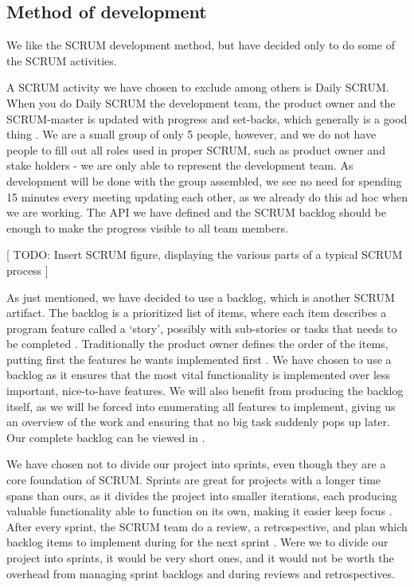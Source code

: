 \subsection{Method of development}
We like the SCRUM development method, but have decided only to do some of the SCRUM activities.

A SCRUM activity we have chosen to exclude among others is Daily SCRUM.
When you do Daily SCRUM the development team, the product owner and the SCRUM-master is updated with progress and set-backs, which generally is a good thing \cite[p. ?]{?}.
We are a small group of only 5 people, however, and we do not have people to fill out all roles used in proper SCRUM, such as product owner and stake holders - we are only able to represent the development team.
As development will be done with the group assembled, we see no need for spending 15 minutes every meeting updating each other, as we already do this ad hoc when we are working.
The API we have defined and the SCRUM backlog should be enough to make the progress visible to all team members.

[ TODO: Insert SCRUM figure, displaying the various parts of a typical SCRUM process ]

As just mentioned, we have decided to use a backlog, which is another SCRUM artifact.
The backlog is a prioritized list of items, where each item describes a program feature called a `story', possibly with sub-stories or tasks that needs to be completed \cite[p. ?]{?}. Traditionally the product owner defines the order of the items, putting first the features he wants implemented first \cite[p. ?]{?}.
We have chosen to use a backlog as it ensures that the most vital functionality is implemented over less important, nice-to-have features. We will also benefit from producing the backlog itself, as we will be forced into enumerating all features to implement, giving us an overview of the work and ensuring that no big task suddenly pops up later.
Our complete backlog can be viewed in .

We have chosen not to divide our project into sprints, even though they are a core foundation of SCRUM.
Sprints are great for projects with a longer time spans than ours, as it divides the project into smaller iterations, each producing valuable functionality able to function on its own, making it easier keep focus \cite[p. ?]{?}.
After every sprint, the SCRUM team do a review, a retrospective, and plan which backlog items to implement during for the next sprint \cite[p. ?]{?}.
Were we to divide our project into sprints, it would be very short ones, and it would not be worth the overhead from managing sprint backlogs and during reviews and retrospectives.

